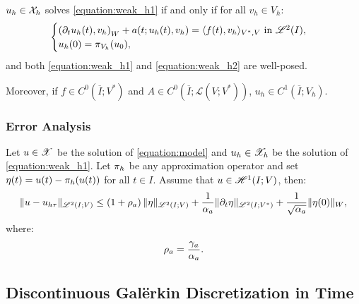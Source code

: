 \begin{proposition}[Equivalence]
    $u_h \in \mathcal{X}_h$ solves \eqref{equation:weak_h1} if and only if for all $v_h \in V_h$:
    \begin{gather}
        \begin{cases} \label{equation:weak_h2}
            \left( \partial_t u_h(t), v_h \right)_W + a(t; u_h(t), v_h) = \langle f(t), v_h \rangle_{V^*, V} \text{ in } \mathscr{L}^{2}(I), \\
            u_h(0) = \pi_{V_h}(u_0),
        \end{cases}
    \end{gather}
    and both \eqref{equation:weak_h1} and \eqref{equation:weak_h2} are well-posed.

    Moreover, if $f \in C^0(\overline{I}; V^*)$ and $A \in C^0(\overline{I}; \mathcal{L}(V; V^*))$, $u_h \in C^1(\overline{I}; V_h)$.
\end{proposition}

\subsubsection{Error Analysis}




\begin{theorem} \label{theorem:estimate_h}
    Let $u \in \mathscr{X}$ be the solution of \eqref{equation:model} and $u_h \in \mathscr{X}_h$ be the solution of \eqref{equation:weak_h1}. Let $\pi_h$ be any approximation operator and set $\eta(t) = u(t) - \pi_h(u(t))$ for all $t \in I$. Assume that $u \in \mathscr{H}^{1}(I; V)$, then:
    \begin{gather}
        \lVert u - u_{h \tau} \rVert_{\mathscr{L}^{2}(I; V)} \leq \left( 1 + \rho_{a} \right) \lVert \eta \rVert_{\mathscr{L}^{2}(I; V)} + \frac{1}{\alpha_{a}} \lVert \partial_t \eta \rVert_{\mathscr{L}^{2}(I; V^*)} + \frac{1}{\sqrt{\alpha_{a}}} \lVert \eta(0) \rVert_W,
    \end{gather}
    where:
    \begin{gather}
        \rho_{a} = \frac{\gamma_{a}}{\alpha_{a}}.
    \end{gather}
\end{theorem}

\newpage
\subsection{Discontinuous Galërkin Discretization in Time}

